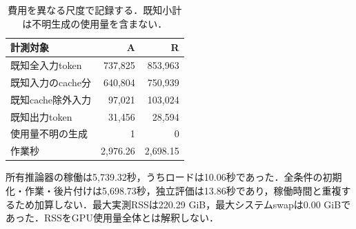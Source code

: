\begin{table}[tb]
\centering\footnotesize\setlength{\tabcolsep}{3pt}
\caption{費用を異なる尺度で記録する．既知小計は不明生成の使用量を含まない．}
\begin{tabular}{lrr}
計測対象 & A & R \\ \hline
既知全入力token & 737,825 & 853,963 \\
既知入力のcache分 & 640,804 & 750,939 \\
既知cache除外入力 & 97,021 & 103,024 \\
既知出力token & 31,456 & 28,594 \\
使用量不明の生成 & 1 & 0 \\
作業秒 & 2,976.26 & 2,698.15 \\
\hline\end{tabular}
\end{table}
所有推論器の稼働は5,739.32秒，うちロードは10.06秒であった．全条件の初期化・作業・後片付けは5,698.73秒，独立評価は13.86秒であり，稼働時間と重複するため加算しない．最大実測RSSは220.29 GiB，最大システムswapは0.00 GiBであった．RSSをGPU使用量全体とは解釈しない．
